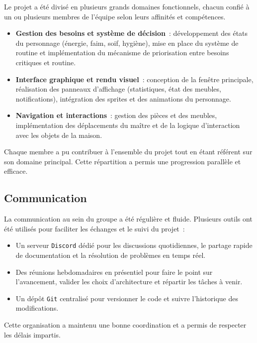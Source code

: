 Le projet a été divisé en plusieurs grands domaines fonctionnels, chacun confié à un ou plusieurs membres de l'équipe selon leurs affinités et compétences.

\begin{itemize}
    \item \textbf{Gestion des besoins et système de décision}~: développement des états du personnage (énergie, faim, soif, hygiène), mise en place du système de routine et implémentation du mécanisme de priorisation entre besoins critiques et routine.
    \item \textbf{Interface graphique et rendu visuel}~: conception de la fenêtre principale, réalisation des panneaux d'affichage (statistiques, état des meubles, notifications), intégration des sprites et des animations du personnage.
    \item \textbf{Navigation et interactions}~: gestion des pièces et des meubles, implémentation des déplacements du maître et de la logique d'interaction avec les objets de la maison.
\end{itemize}

Chaque membre a pu contribuer à l'ensemble du projet tout en étant référent sur son domaine principal. Cette répartition a permis une progression parallèle et efficace.

\subsection{Communication}

La communication au sein du groupe a été régulière et fluide. Plusieurs outils ont été utilisés pour faciliter les échanges et le suivi du projet~:

\begin{itemize}
    \item Un serveur \texttt{Discord} dédié pour les discussions quotidiennes, le partage rapide de documentation et la résolution de problèmes en temps réel.
    \item Des réunions hebdomadaires en présentiel pour faire le point sur l'avancement, valider les choix d'architecture et répartir les tâches à venir.
    \item Un dépôt \texttt{Git} centralisé pour versionner le code et suivre l'historique des modifications.
\end{itemize}

Cette organisation a maintenu une bonne coordination et a permis de respecter les délais impartis.

